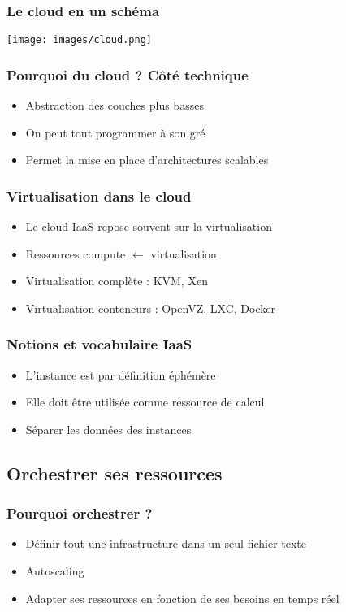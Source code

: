   \begin{frame}
    \frametitle{Le cloud en un schéma}
    \texttt{[image: images/cloud.png]}
  \end{frame}

  \begin{frame}
    \frametitle{Pourquoi du cloud ? Côté technique}
    \begin{itemize}
      \item Abstraction des couches plus basses
      \item On peut tout programmer à son gré
      \item Permet la mise en place d'architectures scalables
    \end{itemize}
  \end{frame}

  \begin{frame}
    \frametitle{Virtualisation dans le cloud}
    \begin{itemize}
      \item Le cloud IaaS repose souvent sur la virtualisation
      \item Ressources compute $\leftarrow$ virtualisation
      \item Virtualisation complète : KVM, Xen
      \item Virtualisation conteneurs : OpenVZ, LXC, Docker
    \end{itemize}
  \end{frame}

  \begin{frame}
    \frametitle{Notions et vocabulaire IaaS}
    \begin{itemize}
      \item L'instance est par définition éphémère
      \item Elle doit être utilisée comme ressource de calcul
      \item Séparer les données des instances
    \end{itemize}
  \end{frame}

  \subsection[Orchestration]{Orchestrer ses ressources}

  \begin{frame}
    \frametitle{Pourquoi orchestrer ?}
    \begin{itemize}
      \item Définir tout une infrastructure dans un seul fichier texte
      \item Autoscaling
        \item Adapter ses ressources en fonction de ses besoins en temps réel
    \end{itemize}
  \end{frame}

